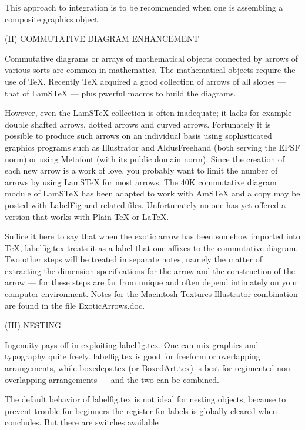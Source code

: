      This approach to integration is to be recommended when
one is assembling a composite graphics object.


 (II)  COMMUTATIVE DIAGRAM ENHANCEMENT

     Commutative diagrams or arrays of mathematical objects
connected by arrows of various sorts are common in mathematics.
The mathematical objects require the use of TeX.  Recently TeX
acquired a good collection of arrows of all slopes --- that of
LamSTeX --- plus pwerful macros to build the diagrams.

     However, even the LamSTeX collection is often
inadequate; it lacks for example double shafted arrows, dotted
arrows and curved arrows. Fortunately it is possible to produce
such arrows on an individual basis using sophisticated graphics
programs such as Illustrator and AldusFreehand (both serving
the EPSF norm) or using Metafont (with its public domain norm).
Since the creation of each new arrow is a work of love, you
probably want to limit the number of arrows by using LamSTeX
for most arrows. The 40K commutative diagram module of LamSTeX
has been adapted to work with AmSTeX and a copy may be posted
with LabelFig and related files. Unfortunately no one has yet
offered a version that works with Plain TeX or LaTeX.

       Suffice it here to say that when the exotic arrow has
been somehow imported into TeX, labelfig.tex treats it as a
label that one affixes to the commutative diagram.  Two other
steps will be treated in separate notes, namely the matter of
extracting the dimension specifications for the arrow and the
construction of the arrow --- for these steps are far from
unique and often depend intimately on your computer environment. 
Notes for the Macintosh-Textures-Illustrator combination are
found in the file ExoticArrows.doc.


 (III) NESTING 

Ingenuity pays off in exploiting labelfig.tex. One can
mix graphics and typography quite freely.  labelfig.tex is good
for freeform or overlapping arrangements, while boxedeps.tex (or
BoxedArt.tex) is best for regimented non-overlapping
arrangements --- and the two can be combined.

     The default behavior of labelfig.tex is not ideal 
for nesting objects, because to prevent trouble for beginners
the register for labels is globally cleared when \AffixLabels
concludes.  But there are switches available

      \LabelsGlobal      \LabelsLocal

